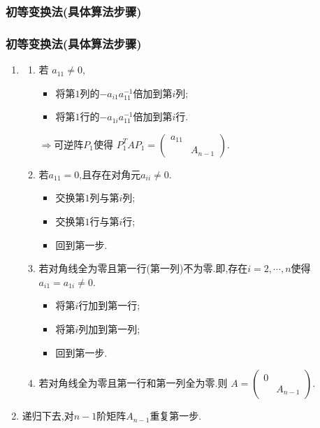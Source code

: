 \subsubsection{初等变换法(具体算法步骤)}
\begin{frame}\frametitle{初等变换法(具体算法步骤)}
\begin{enumerate}
\item[第一步:]
\pp
\begin{enumerate}
\item 若 $a_{11}\neq 0$,
\begin{itemize}
\item 将第$1$列的$-a_{i1}a_{11}^{-1}$倍加到第$i$列;
\item 将第$1$行的$-a_{1i}a_{11}^{-1}$倍加到第$i$行.
\end{itemize}
$\Rightarrow$可逆阵$P_1$使得 $P_1^TAP_1=\begin{pmatrix}a_{11}&\\&A_{n-1}\end{pmatrix}$.
\pp
\item 若$a_{11}=0$,且存在对角元$a_{ii}\neq0$.
\begin{itemize}
\item 交换第$1$列与第$i$列;
\item 交换第$1$行与第$i$行;
\item 回到第一步.
\end{itemize}
\pp
\item 若对角线全为零且第一行(第一列)不为零.即,存在$i=2,\cdots,n$使得$a_{i1}=a_{1i}\neq0$.
\begin{itemize}
\item 将第$i$行加到第一行;
\item 将第$i$列加到第一列;
\item 回到第一步.
\end{itemize}
\pp
\item 若对角线全为零且第一行和第一列全为零.则 $A=\begin{pmatrix}0&\\&A_{n-1}\end{pmatrix}$.
\end{enumerate}
\pp
\item[第二步:] 递归下去,对$n-1$阶矩阵$A_{n-1}$重复第一步.
\end{enumerate}
\end{frame}















